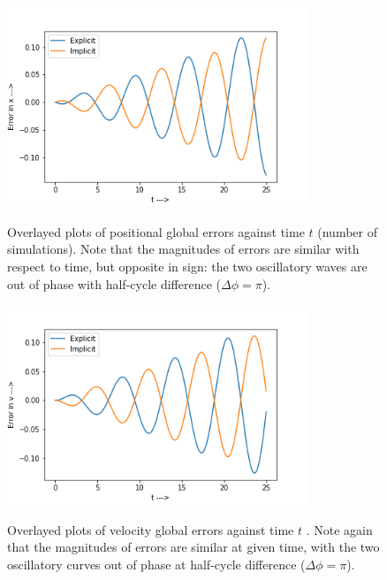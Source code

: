 \documentclass{report}
\begin{document}
\begin{figure}[H]
	\centering
	\includegraphics[width = 0.8\textwidth]{cex.png}
	\label{cex}
	\caption{Overlayed plots of positional global errors against time $t$ (number of simulations). Note that the magnitudes of errors are similar with respect to time, but opposite in sign: the two oscillatory waves are out of phase with half-cycle difference ($\Delta\phi = \pi$).}
\end{figure}
\begin{figure}[H]
	\centering
	\includegraphics[width = 0.8\textwidth]{cev.png}
	\label{cev}
	\caption{Overlayed plots of velocity global errors against time $t$ . Note again that the magnitudes of errors are similar at given time, with the two oscillatory curves out of phase at half-cycle difference ($\Delta\phi = \pi$).}
\end{figure}
\end{document}
